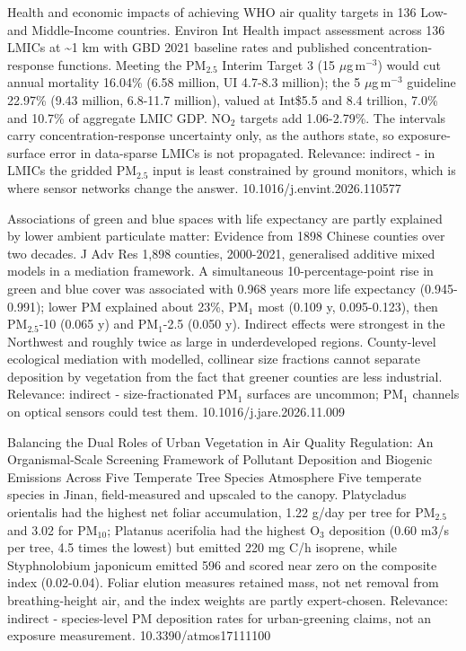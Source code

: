 \documentclass[10pt]{article}
\begin{document}
{Health and economic impacts of achieving WHO air quality targets in 136 Low- and Middle-Income countries.}
{Environ Int}
{Health impact assessment across 136 LMICs at \textasciitilde{}1 km with GBD 2021 baseline rates and published concentration-response functions. Meeting the PM$_{2.5}$ Interim Target 3 (15 $\mu$g\,m$^{-3}$) would cut annual mortality 16.04\% (6.58 million, UI 4.7-8.3 million); the 5 $\mu$g\,m$^{-3}$ guideline 22.97\% (9.43 million, 6.8-11.7 million), valued at Int\$5.5 and 8.4 trillion, 7.0\% and 10.7\% of aggregate LMIC GDP. NO$_2$ targets add 1.06-2.79\%. The intervals carry concentration-response uncertainty only, as the authors state, so exposure-surface error in data-sparse LMICs is not propagated. Relevance: indirect - in LMICs the gridded PM$_{2.5}$ input is least constrained by ground monitors, which is where sensor networks change the answer.}
{10.1016/j.envint.2026.110577}

{Associations of green and blue spaces with life expectancy are partly explained by lower ambient particulate matter: Evidence from 1898 Chinese counties over two decades.}
{J Adv Res}
{1,898 counties, 2000-2021, generalised additive mixed models in a mediation framework. A simultaneous 10-percentage-point rise in green and blue cover was associated with 0.968 years more life expectancy (0.945-0.991); lower PM explained about 23\%, PM$_{1}$ most (0.109 y, 0.095-0.123), then PM$_{2.5}$-10 (0.065 y) and PM$_{1}$-2.5 (0.050 y). Indirect effects were strongest in the Northwest and roughly twice as large in underdeveloped regions. County-level ecological mediation with modelled, collinear size fractions cannot separate deposition by vegetation from the fact that greener counties are less industrial. Relevance: indirect - size-fractionated PM$_{1}$ surfaces are uncommon; PM$_{1}$ channels on optical sensors could test them.}
{10.1016/j.jare.2026.11.009}

{Balancing the Dual Roles of Urban Vegetation in Air Quality Regulation: An Organismal-Scale Screening Framework of Pollutant Deposition and Biogenic Emissions Across Five Temperate Tree Species}
{Atmosphere}
{Five temperate species in Jinan, field-measured and upscaled to the canopy. Platycladus orientalis had the highest net foliar accumulation, 1.22 g/day per tree for PM$_{2.5}$ and 3.02 for PM$_{10}$; Platanus acerifolia had the highest O$_3$ deposition (0.60 m3/s per tree, 4.5 times the lowest) but emitted 220 mg C/h isoprene, while Styphnolobium japonicum emitted 596 and scored near zero on the composite index (0.02-0.04). Foliar elution measures retained mass, not net removal from breathing-height air, and the index weights are partly expert-chosen. Relevance: indirect - species-level PM deposition rates for urban-greening claims, not an exposure measurement.}
{10.3390/atmos17111100}
\end{document}
